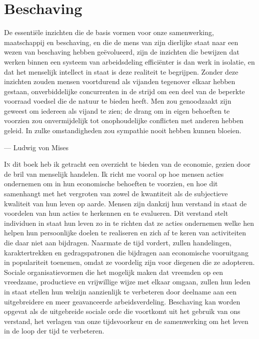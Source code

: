\hypertarget{beschaving}{%
\chapter{Beschaving}\label{beschaving}}

\vspace{-1em}
\begin{blockquotebox}
    De essentiële inzichten die de basis vormen voor onze samenwerking, maatschappij en beschaving, en die de mens van zijn dierlijke staat naar een wezen van beschaving hebben geëvolueerd, zijn de inzichten die bewijzen dat werken binnen een systeem van arbeidsdeling efficiënter is dan werk in isolatie, en dat het menselijk intellect in staat is deze realiteit te begrijpen. Zonder deze inzichten zouden mensen voortdurend als vijanden tegenover elkaar hebben gestaan, onverbiddelijke concurrenten in de strijd om een deel van de beperkte voorraad voedsel die de natuur te bieden heeft. Men zou genoodzaakt zijn geweest om iedereen als vijand te zien; de drang om in eigen behoeften te voorzien zou onvermijdelijk tot onophoudelijke conflicten met anderen hebben geleid. In zulke omstandigheden zou sympathie nooit hebben kunnen bloeien.\footnotemark
    \par\raggedleft--- Ludwig von Mises
\end{blockquotebox}
\autocite{213}

\lettrine{I}n dit boek heb ik getracht een overzicht te bieden van de economie, gezien door de bril van menselijk handelen. Ik richt me vooral op hoe mensen acties ondernemen om in hun economische behoeften te voorzien, en hoe dit samenhangt met het vergroten van zowel de kwantiteit als de subjectieve kwaliteit van hun leven op aarde. Mensen zijn dankzij hun verstand in staat de voordelen van hun acties te herkennen en te evalueren. Dit verstand stelt individuen in staat hun leven zo in te richten dat ze acties ondernemen welke hen helpen hun persoonlijke doelen te realiseren en zich af te keren van activiteiten die daar niet aan bijdragen. Naarmate de tijd vordert, zullen handelingen, karaktertrekken en gedragspatronen die bijdragen aan economische vooruitgang in populariteit toenemen, omdat ze voordelig zijn voor diegenen die ze adopteren. Sociale organisatievormen die het mogelijk maken dat vreemden op een vreedzame, productieve en vrijwillige wijze met elkaar omgaan, zullen hun leden in staat stellen hun welzijn aanzienlijk te verbeteren door deelname aan een uitgebreidere en meer geavanceerde arbeidsverdeling. Beschaving kan worden opgevat als de uitgebreide sociale orde die voortkomt uit het gebruik van ons verstand, het verlagen van onze tijdsvoorkeur en de samenwerking om het leven in de loop der tijd te verbeteren.

